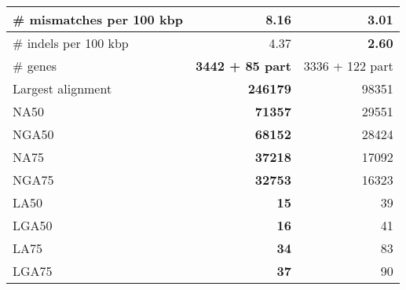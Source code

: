 \documentclass[12pt,a4paper]{article}
\begin{document}
\begin{table}[ht]
\begin{center}
\begin{tabular}{|l*{2}{|r}|}
\# mismatches per 100 kbp & 8.16 & {\bf 3.01} \\ \hline
\# indels per 100 kbp & 4.37 & {\bf 2.60} \\ \hline
\# genes & {\bf 3442 + 85 part} & 3336 + 122 part \\ \hline
Largest alignment & {\bf 246179} & 98351 \\ \hline
NA50 & {\bf 71357} & 29551 \\ \hline
NGA50 & {\bf 68152} & 28424 \\ \hline
NA75 & {\bf 37218} & 17092 \\ \hline
NGA75 & {\bf 32753} & 16323 \\ \hline
LA50 & {\bf 15} & 39 \\ \hline
LGA50 & {\bf 16} & 41 \\ \hline
LA75 & {\bf 34} & 83 \\ \hline
LGA75 & {\bf 37} & 90 \\ \hline
\end{tabular}
\end{center}
\end{table}
\end{document}
